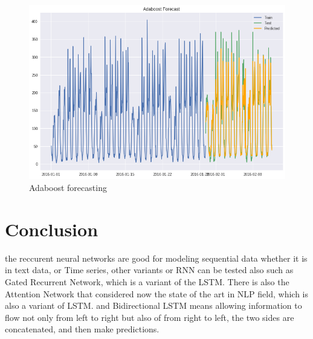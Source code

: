 \begin{figure}[!h]
\centering
\includegraphics[scale=.6]{img/adaboost_results.png}  
\caption{Adaboost forecasting}
\label{fig:adaboost}
\end{figure}



\section{Conclusion}
the reccurent neural networks are good for modeling sequential data whether it is in text data, or Time series, other variants or RNN can be tested also such as  Gated Recurrent Network, which is a variant of the LSTM. There is also the Attention Network that considered now the state of the art in NLP field, which is also a variant of LSTM. and Bidirectional LSTM means allowing information to flow not only from left to right but also of from right to left, the two sides are concatenated, and then make predictions. 




